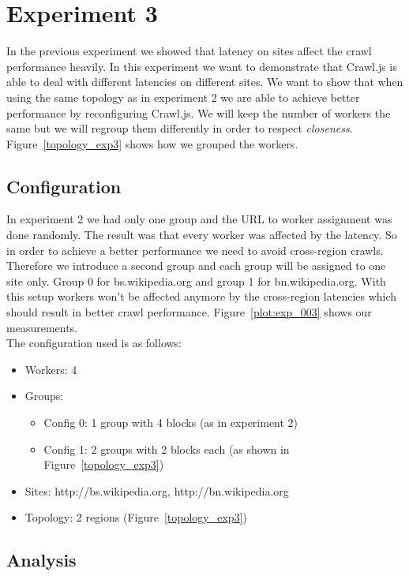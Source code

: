 \section{Experiment 3}

In the previous experiment we showed that latency on sites affect the crawl performance heavily. In this experiment we want to demonstrate that Crawl.js is able to deal with different latencies on different sites. We want to show that when using the same topology as in experiment 2 we are able to achieve better performance by reconfiguring Crawl.js. We will keep the number of workers the same but we will regroup them differently in order to respect \emph{closeness}. Figure~\ref{topology_exp3} shows how we grouped the workers. 

\subsection{Configuration}
In experiment 2 we had only one group and the URL to worker assignment was done randomly. The result was that every worker was affected by the latency. So in order to achieve a better performance we need to avoid cross-region crawls. Therefore we introduce a second group and each group will be assigned to one site only. Group 0 for bs.wikipedia.org and group 1 for bn.wikipedia.org. With this setup workers won't be affected anymore by the cross-region latencies which should result in better crawl performance. Figure~\ref{plot:exp_003} shows our measurements.
\\
The configuration used is as follows:
\begin{itemize}
  \item Workers: 4
  \item Groups:
    \begin{itemize}
      \item Config 0: 1 group with 4 blocks (as in experiment 2)
      \item Config 1: 2 groups with 2 blocks each (as shown in Figure~\ref{topology_exp3})
    \end{itemize}
  \item Sites: http://bs.wikipedia.org, http://bn.wikipedia.org
  \item Topology: 2 regions (Figure~\ref{topology_exp3})
\end{itemize}

\subsection{Analysis}

